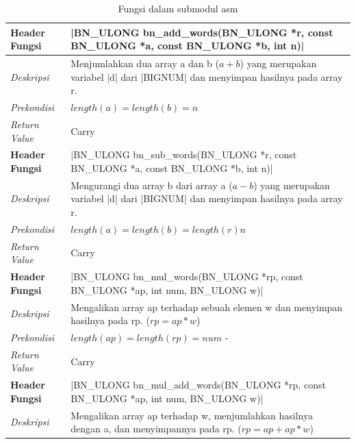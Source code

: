       \begin{table}[h]
        \caption{Fungsi dalam submodul asm}
        \begin{tabular}{R{2.8cm}L{10.5cm}}
          \toprule
          \textbf{Header Fungsi} & |BN_ULONG bn_add_words(BN_ULONG *r, const BN_ULONG *a, const BN_ULONG *b, int n)|  \\ \midrule
          \textit{Deskripsi} & Menjumlahkan dua array a dan b ($a+b$) yang merupakan variabel |d| dari |BIGNUM| dan menyimpan hasilnya pada array r.                                                                                     \\
          \textit{Prekondisi}    & $length(a) = length(b) = n$                                 \\
          \textit{Return Value}  & Carry
          \\ \bottomrule
          \textbf{Header Fungsi} & |BN_ULONG bn_sub_words(BN_ULONG *r, const BN_ULONG *a, const BN_ULONG *b, int n)|  \\ \midrule
          \textit{Deskripsi} & Mengurangi dua array b dari array a ($a-b$) yang merupakan variabel |d| dari |BIGNUM| dan menyimpan hasilnya pada array r.                                                                                     \\
          \textit{Prekondisi}    & $length(a) = length(b) = length(r) n$                                 \\
          \textit{Return Value}  & Carry
          \\ \bottomrule
          \textbf{Header Fungsi} & |BN_ULONG bn_mul_words(BN_ULONG *rp, const BN_ULONG *ap, int num, BN_ULONG w)|     \\ \midrule
          \textit{Deskripsi} & Mengalikan array ap terhadap sebuah elemen w dan menyimpan hasilnya pada rp. ($rp = ap * w$)                                                                                      \\
          \textit{Prekondisi}    & $length(ap) = length(rp) = num$ -                                                                                  \\
          \textit{Return Value}  & Carry
          \\ \bottomrule
          \textbf{Header Fungsi} & |BN_ULONG bn_mul_add_words(BN_ULONG *rp, const BN_ULONG *ap, int num, BN_ULONG w)| \\ \midrule
          \textit{Deskripsi} & Mengalikan array ap terhadap w, menjumlahkan hasilnya dengan a, dan menyimpannya pada rp. ($rp = ap + ap * w$)                                                                                    \\

\end{tabular}
\end{table}
